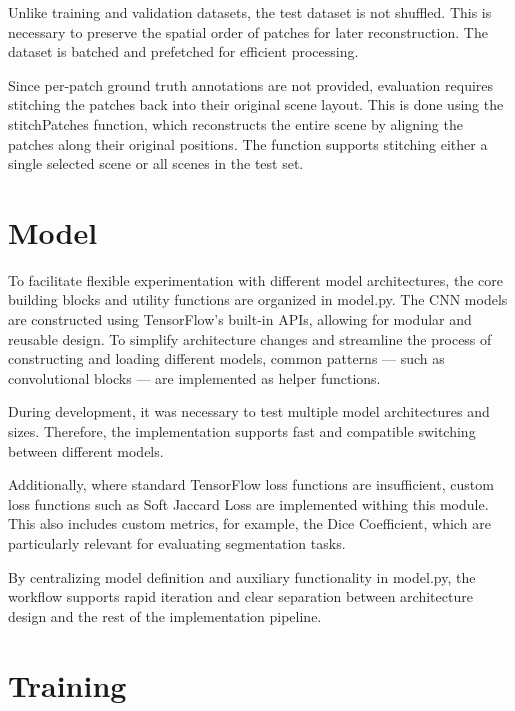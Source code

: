 {Unlike training and validation datasets, the test dataset is not shuffled. This is necessary to preserve the spatial order of patches for later reconstruction. The dataset is batched and prefetched for efficient processing.

Since per-patch ground truth annotations are not provided, evaluation requires stitching the patches back into their original scene layout. This is done using the stitchPatches function, which reconstructs the entire scene by aligning the patches along their original positions. The function supports stitching either a single selected scene or all scenes in the test set.

\section{Model}

To facilitate flexible experimentation with different model architectures, the core building blocks and utility functions are organized in model.py. The CNN models are constructed using TensorFlow’s built-in APIs, allowing for modular and reusable design. To simplify architecture changes and streamline the process of constructing and loading different models, common patterns --- such as convolutional blocks --- are implemented as helper functions.

During development, it was necessary to test multiple model architectures and sizes. Therefore, the implementation supports fast and compatible switching between different models.

Additionally, where standard TensorFlow loss functions are insufficient, custom loss functions such as Soft Jaccard Loss are implemented withing this module. This also includes custom metrics, for example, the Dice Coefficient, which are particularly relevant for evaluating segmentation tasks.

By centralizing model definition and auxiliary functionality in model.py, the workflow supports rapid iteration and clear separation between architecture design and the rest of the implementation pipeline.


\section{Training}

}
